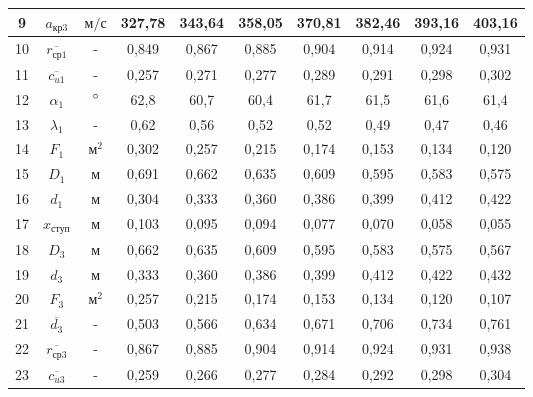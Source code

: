 \begin{landscape}
\begin{center}
\begin{longtable}{|c|c|c|c|c|c|c|c|c|c|}
				9 & $a_{кр3}$ & $м/с$ & 327,78 & 343,64 & 358,05 & 370,81 & 382,46 & 393,16 & 403,16 \\\hline
			
				10 & $\overline{r_{ср1}}$ & - & 0,849 & 0,867 & 0,885 & 0,904 & 0,914 & 0,924 & 0,931 \\\hline
			
				11 & $\overline{c_{u1}}$ & - & 0,257 & 0,271 & 0,277 & 0,289 & 0,291 & 0,298 & 0,302 \\\hline
			
				12 & $\alpha_1$ & $\degree$ & 62,8 & 60,7 & 60,4 & 61,7 & 61,5 & 61,6 & 61,4 \\\hline
			
				13 & $\lambda_1$ & - & 0,62 & 0,56 & 0,52 & 0,52 & 0,49 & 0,47 & 0,46 \\\hline
			
				14 & $F_1$ & $м^2$ & 0,302 & 0,257 & 0,215 & 0,174 & 0,153 & 0,134 & 0,120 \\\hline
			
				15 & $D_1$ & м & 0,691 & 0,662 & 0,635 & 0,609 & 0,595 & 0,583 & 0,575 \\\hline
			
				16 & $d_1$ & м & 0,304 & 0,333 & 0,360 & 0,386 & 0,399 & 0,412 & 0,422 \\\hline
			
				17 & $x_{ступ}$ & м & 0,103 & 0,095 & 0,094 & 0,077 & 0,070 & 0,058 & 0,055 \\\hline
			
				18 & $D_3$ & м & 0,662 & 0,635 & 0,609 & 0,595 & 0,583 & 0,575 & 0,567 \\\hline
			
				19 & $d_3$ & м & 0,333 & 0,360 & 0,386 & 0,399 & 0,412 & 0,422 & 0,432 \\\hline
			
				20 & $F_3$ & $м^2$ & 0,257 & 0,215 & 0,174 & 0,153 & 0,134 & 0,120 & 0,107 \\\hline
			
				21 & $\overline{d_3}$ & - & 0,503 & 0,566 & 0,634 & 0,671 & 0,706 & 0,734 & 0,761 \\\hline
			
				22 & $\overline{r_{ср3}}$ & - & 0,867 & 0,885 & 0,904 & 0,914 & 0,924 & 0,931 & 0,938 \\\hline
			
				23 & $\overline{c_{u3}}$ & - & 0,259 & 0,266 & 0,277 & 0,284 & 0,292 & 0,298 & 0,304 \\\hline
			

\end{longtable}
\end{center}
\end{landscape}
